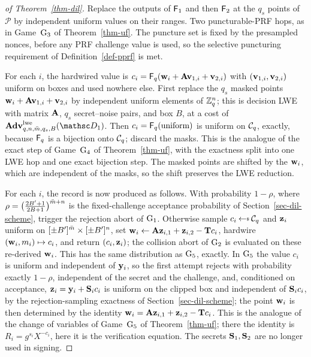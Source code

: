 \begin{proof}[of Theorem~\ref{thm-dil}]
 Replace the outputs of $\mathsf{F}_1$ and then $\mathsf{F}_2$ at the $q_s$ points of $\mathcal{P}$ by independent uniform values on their ranges. Two puncturable-PRF hops, as in Game~$\textnormal{G}_3$ of Theorem~\ref{thm-uf}. The puncture set is fixed by the presampled nonces, before any PRF challenge value is used, so the selective puncturing requirement of Definition~\ref{def-pprf} is met.

 For each $i$, the hardwired value is $c_i = \mathsf{F}_q(\mathbf{w}_i + \mathbf{A}\mathbf{v}_{1,i} + \mathbf{v}_{2,i})$ with $(\mathbf{v}_{1,i}, \mathbf{v}_{2,i})$ uniform on boxes and used nowhere else. First replace the $q_s$ masked points $\mathbf{w}_i + \mathbf{A}\mathbf{v}_{1,i} + \mathbf{v}_{2,i}$ by independent uniform elements of $\mathbb{Z}_q^n$; this is decision LWE with matrix $\mathbf{A}$, $q_s$ secret--noise pairs, and box $B$, at a cost of $\AdvLWE{q,n,\colsA,q_s,B}{\advD_1}$. Then $c_i = \mathsf{F}_q(\text{uniform})$ is uniform on $\mathcal{C}_q$, exactly, because $\mathsf{F}_q$ is a bijection onto $\mathcal{C}_q$; discard the masks. This is the analogue of the exact step of Game~$\textnormal{G}_4$ of Theorem~\ref{thm-uf}, with the exactness split into one LWE hop and one exact bijection step. The masked points are shifted by the $\mathbf{w}_i$, which are independent of the masks, so the shift preserves the LWE reduction.

 For each $i$, the record is now produced as follows. With probability $1-\rho$, where $\rho = \big(\tfrac{2B'+1}{2B+1}\big)^{\bar m+n}$ is the fixed-challenge acceptance probability of Section~\ref{sec-dil-scheme}, trigger the rejection abort of $\textnormal{G}_1$. Otherwise sample $c_i \getsr \chal_q$ and $\mathbf{z}_i$ uniform on $[\pm B']^{\bar m} \times [\pm B']^{n}$, set $\mathbf{w}_i \gets \mathbf{A}\mathbf{z}_{i,1} + \mathbf{z}_{i,2} - \mathbf{T}c_i$, hardwire $(\mathbf{w}_i, m_i) \mapsto c_i$, and return $(c_i, \mathbf{z}_i)$; the collision abort of $\textnormal{G}_2$ is evaluated on these re-derived $\mathbf{w}_i$. This has the same distribution as $\textnormal{G}_5$, exactly. In $\textnormal{G}_5$ the value $c_i$ is uniform and independent of $\mathbf{y}_i$, so the first attempt rejects with probability exactly $1-\rho$, independent of the secret and the challenge, and, conditioned on acceptance, $\mathbf{z}_i = \mathbf{y}_i + \mathbf{S}_ic_i$ is uniform on the clipped box and independent of $\mathbf{S}_ic_i$, by the rejection-sampling exactness of Section~\ref{sec-dil-scheme}; the point $\mathbf{w}_i$ is then determined by the identity $\mathbf{w}_i = \mathbf{A}\mathbf{z}_{i,1} + \mathbf{z}_{i,2} - \mathbf{T}c_i$. This is the analogue of the change of variables of Game~$\textnormal{G}_5$ of Theorem~\ref{thm-uf}; there the identity is $R_i = g^{s_i}X^{-c_i}$, here it is the verification equation. The secrets $\mathbf{S}_1, \mathbf{S}_2$ are no longer used in signing.


\end{proof}
